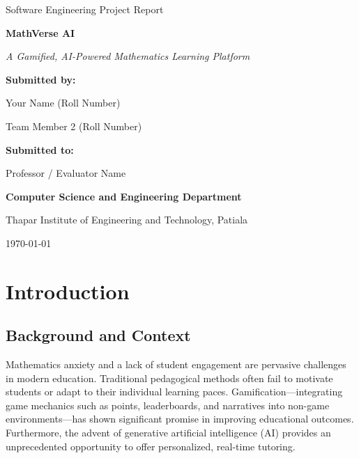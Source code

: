 \documentclass[12pt,a4paper]{report}
\begin{document}
\begin{titlepage}
    \centering
    \vspace*{2cm}
    
    {\Large Software Engineering Project Report \par}
    \vspace{1.5cm}
    
    {\Huge\bfseries MathVerse AI \par}
    \vspace{0.5cm}
    {\Large \textit{A Gamified, AI-Powered Mathematics Learning Platform} \par}
    
    \vspace{3cm}
    
    {\Large \textbf{Submitted by:} \par}
    Your Name (Roll Number) \par
    Team Member 2 (Roll Number) \par
    \vspace{1.5cm}
    
    {\Large \textbf{Submitted to:} \par}
    Professor / Evaluator Name \par
    
    \vfill
    
    {\Large \textbf{Computer Science and Engineering Department} \par}
    {\Large Thapar Institute of Engineering and Technology, Patiala \par}
    \vspace{1cm}
    
    {\large \today \par}
\end{titlepage}

\tableofcontents
\newpage

\chapter{Introduction}

\section{Background and Context}
Mathematics anxiety and a lack of student engagement are pervasive challenges in modern education. Traditional pedagogical methods often fail to motivate students or adapt to their individual learning paces. Gamification—integrating game mechanics such as points, leaderboards, and narratives into non-game environments—has shown significant promise in improving educational outcomes. Furthermore, the advent of generative artificial intelligence (AI) provides an unprecedented opportunity to offer personalized, real-time tutoring. 
\end{document}
